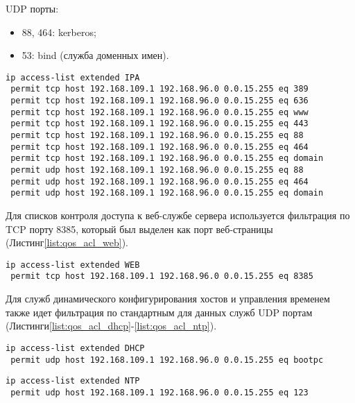 \documentclass[14pt, a4paper]{extarticle}
\begin{document}
\begin{appendices}
UDP порты:
\begin{itemize}
\item 88, 464: kerberos;
\item 53: bind (служба доменных имен).
\end{itemize}

\begin{lstlisting}[caption=Список контроля доступа для службы управления пользователями\label{list:qos_acl_ipa}]
ip access-list extended IPA
 permit tcp host 192.168.109.1 192.168.96.0 0.0.15.255 eq 389
 permit tcp host 192.168.109.1 192.168.96.0 0.0.15.255 eq 636
 permit tcp host 192.168.109.1 192.168.96.0 0.0.15.255 eq www
 permit tcp host 192.168.109.1 192.168.96.0 0.0.15.255 eq 443
 permit tcp host 192.168.109.1 192.168.96.0 0.0.15.255 eq 88
 permit tcp host 192.168.109.1 192.168.96.0 0.0.15.255 eq 464
 permit tcp host 192.168.109.1 192.168.96.0 0.0.15.255 eq domain
 permit udp host 192.168.109.1 192.168.96.0 0.0.15.255 eq 88
 permit udp host 192.168.109.1 192.168.96.0 0.0.15.255 eq 464
 permit udp host 192.168.109.1 192.168.96.0 0.0.15.255 eq domain
\end{lstlisting}

Для списков контроля доступа к веб-службе сервера используется фильтрация по TCP порту 8385, который был выделен как порт веб-страницы (Листинг\;\ref{list:qos_acl_web}).

\begin{lstlisting}[caption=Список контроля доступа для веб-сервера\label{list:qos_acl_web}]
ip access-list extended WEB
 permit tcp host 192.168.109.1 192.168.96.0 0.0.15.255 eq 8385
\end{lstlisting}

Для служб динамического конфигурирования хостов и управления временем также идет фильтрация по стандартным для данных служб UDP портам (Листинги\;\ref{list:qos_acl_dhcp}-\ref{list:qos_acl_ntp}).

\begin{lstlisting}[caption=Список контроля доступа для службы динамического конфигурирования хостов\label{list:qos_acl_dhcp}]
ip access-list extended DHCP
 permit udp host 192.168.109.1 192.168.96.0 0.0.15.255 eq bootpc
\end{lstlisting}

\begin{lstlisting}[caption=Список контроля доступа для службы управления временем\label{list:qos_acl_ntp}]
ip access-list extended NTP
 permit udp host 192.168.109.1 192.168.96.0 0.0.15.255 eq 123
\end{lstlisting}


\end{appendices}
\end{document}
